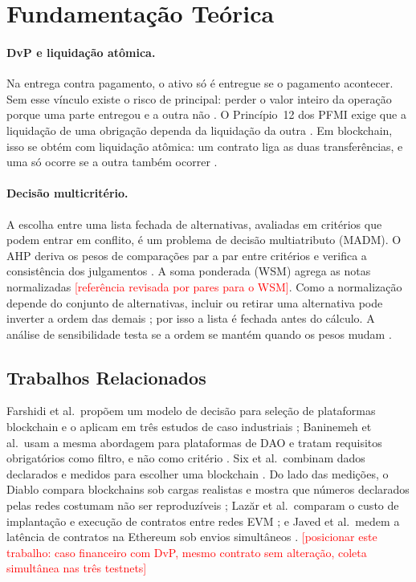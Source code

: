 \documentclass[10pt,a4paper]{article}
\newcommand{\pendente}[1]{\textcolor{red}{[#1]}}
\begin{document}
\section{Fundamentação Teórica}\label{sec:fundamentacao}

\paragraph{DvP e liquidação atômica.} Na entrega contra pagamento, o ativo só é entregue se o pagamento acontecer. Sem esse vínculo existe o risco de principal: perder o valor inteiro da operação porque uma parte entregou e a outra não \cite{bis1992dvp}. O Princípio~12 dos PFMI exige que a liquidação de uma obrigação dependa da liquidação da outra \cite{cpss2012pfmi}. Em blockchain, isso se obtém com liquidação atômica: um contrato liga as duas transferências, e uma só ocorre se a outra também ocorrer \cite{bis2020qr}.

\paragraph{Decisão multicritério.} A escolha entre uma lista fechada de alternativas, avaliadas em critérios que podem entrar em conflito, é um problema de decisão multiatributo (MADM). O AHP deriva os pesos de comparações par a par entre critérios e verifica a consistência dos julgamentos \cite{saaty2001}. A soma ponderada (WSM) agrega as notas normalizadas \pendente{referência revisada por pares para o WSM}. Como a normalização depende do conjunto de alternativas, incluir ou retirar uma alternativa pode inverter a ordem das demais \cite{belton1983}; por isso a lista é fechada antes do cálculo. A análise de sensibilidade testa se a ordem se mantém quando os pesos mudam \cite{triantaphyllou1997}.

\subsection{Trabalhos Relacionados}

Farshidi et al.\ propõem um modelo de decisão para seleção de plataformas blockchain e o aplicam em três estudos de caso industriais \cite{farshidi2020}; Baninemeh et al.\ usam a mesma abordagem para plataformas de DAO e tratam requisitos obrigatórios como filtro, e não como critério \cite{baninemeh2023}. Six et al.\ combinam dados declarados e medidos para escolher uma blockchain \cite{six2020}. Do lado das medições, o Diablo compara blockchains sob cargas realistas e mostra que números declarados pelas redes costumam não ser reproduzíveis \cite{gramoli2023}; Lazăr et al.\ comparam o custo de implantação e execução de contratos entre redes EVM \cite{lazar2025}; e Javed et al.\ medem a latência de contratos na Ethereum sob envios simultâneos \cite{javed2025}. \pendente{posicionar este trabalho: caso financeiro com DvP, mesmo contrato sem alteração, coleta simultânea nas três testnets}
\end{document}
